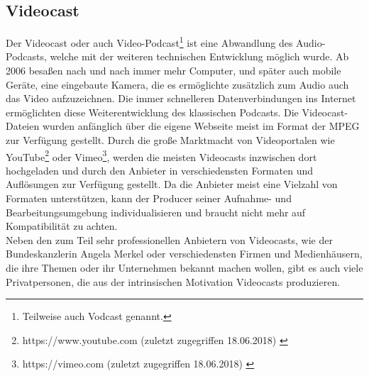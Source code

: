 \documentclass[11pt,a4paper]{scrreprt}
\begin{document}
\subsection{Videocast}
Der Videocast oder auch Video-Podcast\footnote{Teilweise auch Vodcast genannt.} ist eine Abwandlung des Audio-Podcasts, welche mit der weiteren technischen Entwicklung möglich wurde. Ab 2006 besaßen nach und nach immer mehr Computer, und später auch mobile Geräte, eine eingebaute Kamera, die es ermöglichte zusätzlich zum Audio auch das Video aufzuzeichnen. Die immer schnelleren Datenverbindungen ins Internet ermöglichten diese Weiterentwicklung des klassischen Podcasts. Die Videocast-Dateien wurden anfänglich über die eigene Webseite meist im Format der \ac{MPEG} zur Verfügung gestellt. Durch die große Marktmacht von Videoportalen wie YouTube\footnote{https://www.youtube.com (zuletzt zugegriffen 18.06.2018) \cite{YouTubeLLC}} oder Vimeo\footnote{https://vimeo.com (zuletzt zugegriffen 18.06.2018) \cite{Inc.}}, werden die meisten Videocasts inzwischen dort hochgeladen und durch den Anbieter in verschiedensten Formaten und Auflösungen zur Verfügung gestellt. Da die Anbieter meist eine Vielzahl von Formaten unterstützen, kann der Producer seiner Aufnahme- und Bearbeitungsumgebung individualisieren und braucht nicht mehr auf Kompatibilität zu achten.\\
Neben den zum Teil sehr professionellen Anbietern von Videocasts, wie der Bundeskanzlerin Angela Merkel \cite{Merkel2006} oder verschiedensten Firmen und Medienhäusern, die ihre Themen oder ihr Unternehmen bekannt machen wollen, gibt es auch viele Privatpersonen, die aus der intrinsischen Motivation Videocasts produzieren. 
\end{document}
